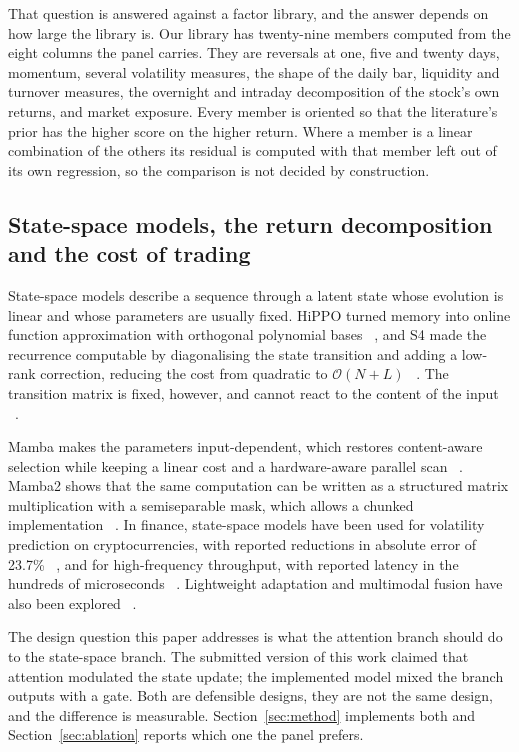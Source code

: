 \documentclass[pdflatex,sn-mathphys-ay]{sn-jnl}
\theoremstyle{thmstyleone}%
\theoremstyle{thmstyletwo}%
\theoremstyle{thmstyletwo}%
\begin{document}
That question is answered against a factor library, and the answer depends on how large the library
is. Our library has twenty-nine members computed from the eight columns the panel carries. They are
reversals at one, five and twenty days, momentum, several volatility measures, the shape of the
daily bar, liquidity and turnover measures, the overnight and intraday decomposition of the stock's
own returns, and market exposure. Every member is oriented so that the literature's prior has the
higher score on the higher return. Where a member is a linear combination of the others its residual
is computed with that member left out of its own regression, so the comparison is not decided by
construction.

\subsection{State-space models, the return decomposition and the cost of trading}

State-space models describe a sequence through a latent state whose evolution is linear and whose
parameters are usually fixed. HiPPO turned memory into online function approximation with
orthogonal polynomial bases ~\citep{gu2020hippo}, and S4 made the recurrence computable by
diagonalising the state transition and adding a low-rank correction, reducing the cost from
quadratic to $\mathcal{O}(N+L)$ ~\citep{gu2022efficiently}. The transition matrix is fixed, however,
and cannot react to the content of the input ~\citep{popov2026scaling}.

Mamba makes the parameters input-dependent, which restores content-aware selection while keeping a
linear cost and a hardware-aware parallel scan ~\citep{gu2024linear}. Mamba2 shows that the same
computation can be written as a structured matrix multiplication with a semiseparable mask, which
allows a chunked implementation ~\citep{Mamba2}. In finance, state-space models have been used for
volatility prediction on cryptocurrencies, with reported reductions in absolute error of 23.7\%
~\citep{zhao2026cryptomamba}, and for high-frequency throughput, with reported latency in the
hundreds of microseconds ~\citep{popov2026scaling}. Lightweight adaptation and multimodal fusion have
also been explored ~\citep{annepaka2025large,kadiyala2025mamba}.

The design question this paper addresses is what the attention branch should do to the state-space
branch. The submitted version of this work claimed that attention modulated the state update; the
implemented model mixed the branch outputs with a gate. Both are defensible designs, they are not
the same design, and the difference is measurable. Section~\ref{sec:method} implements both and
Section~\ref{sec:ablation} reports which one the panel prefers.
\end{document}
